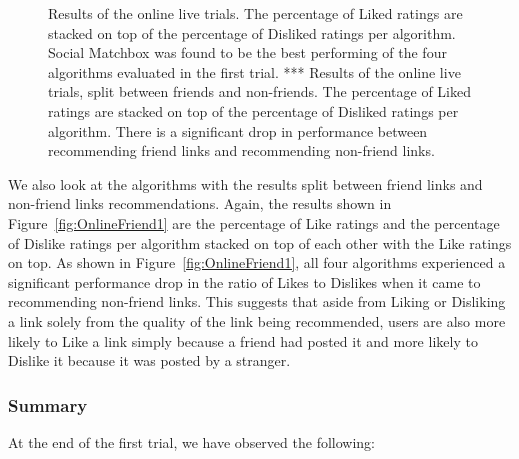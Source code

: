 \begin{figure}[t!]
\caption{Results of the online live trials. The percentage of Liked
ratings are stacked on top of the percentage of Disliked ratings per
algorithm. Social Matchbox was found to be the best performing of the
four algorithms evaluated in the first trial.  *** Results of the online
live trials, split between friends and non-friends. The percentage of
Liked ratings are stacked on top of the percentage of Disliked ratings
per algorithm. There is a significant drop in performance between
recommending friend links and recommending non-friend links.}
\label{fig:OnlineResult1}
\end{figure}

We also look at the algorithms with the results split between friend
links and non-friend links recommendations. Again, the results shown
in Figure~\ref{fig:OnlineFriend1} are the percentage of Like ratings
and the percentage of Dislike ratings per algorithm stacked on top of
each other with the Like ratings on top. As shown in
Figure~\ref{fig:OnlineFriend1}, all four algorithms experienced a
significant performance drop in the ratio of Likes to Dislikes when it
came to recommending non-friend links. This suggests that aside from
Liking or Disliking a link solely from the quality of the link being
recommended, users are also more likely to Like a link simply because
a friend had posted it and more likely to Dislike it because it was
posted by a stranger.

\subsubsection{Summary}

At the end of the first trial, we have observed the following:

